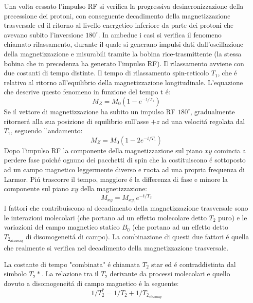 \documentclass[a4paper,12pt]{report}
\begin{document}
 Una volta cessato l'impulso RF si verifica la progressiva desincronizzazione della precessione dei protoni, con conseguente decadimento della magnetizzazione trasversale ed il ritorno al livello energetico inferiore da parte dei protoni che avevano subito l'inversione $180^{\circ}$.
 In ambedue i casi si verifica il fenomeno chiamato rilassamento, durante il quale si generano impulsi dati dall'oscillazione della magnetizzazione e misurabili tramite la bobina rice-trasmittente (la stessa bobina che in precedenza ha generato l'impulso RF).
 Il rilassamento avviene con due costanti di tempo distinte.
 Il tempo di rilassamento spin-reticolo $T_1$, che \'e relativo al ritorno all'equilibrio della magnetizzazione longitudinale. 
 L'equazione che descrive questo fenomeno in funzione del tempo t \'e:
 \begin{equation}
  M_Z = M_0 ( 1 - e^{-t/T_1} )
 \end{equation}
 Se il vettore di magnetizzazione ha subito un impulso RF $180^{\circ}$, gradualmente ritorner\'a alla sua posizione di equilibrio sull'asse $+z$ ad una velocit\'a regolata dal $T_1$, seguendo l'andamento:
 \begin{equation}
  M_Z = M_0 ( 1 - 2e^{-t/T_1} )
 \end{equation}
 Dopo l'impulso RF la componente della magnetizzazione sul piano $xy$ comincia a perdere fase poich\'e ognuno dei pacchetti di spin che la costituiscono \'e sottoposto ad un campo magnetico leggermente diverso e ruota ad una propria frequenza di Larmor. 
 Pi\'u trascorre il tempo, maggiore \'e la differenza di fase e minore la componente sul piano $xy$ della magnetizzazione:
 \begin{equation}
  M_{xy} = M_{xy_0} e^{-t/T_2}
 \end{equation}
 I fattori che contribuiscono al decadimento della magnetizzazione trasversale sono le interazioni molecolari (che portano ad un effetto molecolare detto $T_2$ puro) e le variazioni del campo magnetico statico $B_0$ (che portano ad un effetto detto $T_{2_{disomog}}$ di disomogeneit\'a di campo).
 La combinazione di questi due fattori \'e quella che realmente si verifica nel decadimento della magnetizzazione trasversale.
 
 La costante di tempo "combinata" \'e chiamata $T_2$ star ed \'e contraddistinta dal simbolo $T_2*$. La relazione tra il $T_2$ derivante da processi molecolari e quello dovuto a disomogeneit\'a di campo magnetico \'e la seguente:
\begin{equation}
 1 / T_2^* = 1 / T_2 + 1 / T_{2_{disomog}}
\end{equation}
\end{document}
